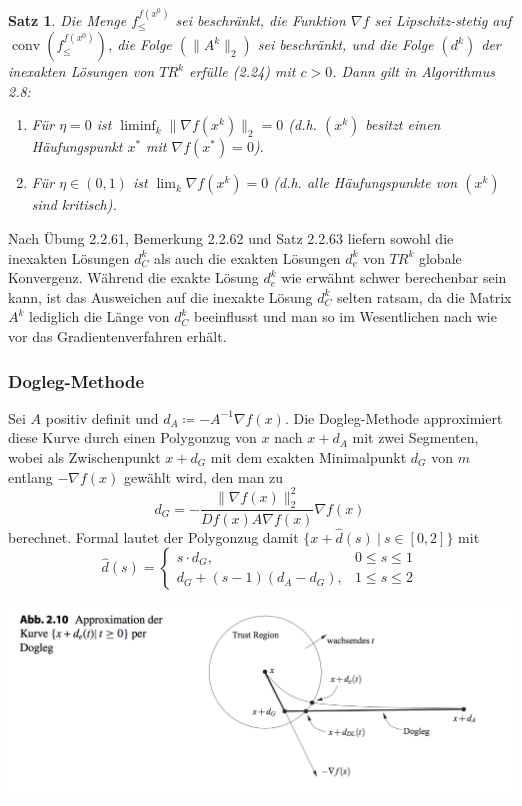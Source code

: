 \documentclass[11pt]{scrreprt}
\newcounter{thm}
\theoremstyle{thmstyle}
\numberwithin{thm}{section}
\newtheorem{satz}[thm]{Satz}
\begin{document}
\begin{satz}
	Die Menge $f_{\leq}^{f(x^0)}$ sei beschränkt, die Funktion $\nabla f$ sei Lipschitz-stetig auf $\operatorname{conv}(f_{\leq}^{f(x^0)})$, die Folge $(\|A^k\|_2)$ sei beschränkt, und die Folge $(d^k)$ der inexakten Lösungen von $TR^k$ erfülle (2.24) mit $c > 0$. Dann gilt in Algorithmus 2.8:
	\begin{enumerate}[label=\alph*\upshape)]
		\item Für $\eta = 0$ ist $\liminf_k \| \nabla f(x^k) \|_2 = 0$ (d.h. $(x^k)$ besitzt einen Häufungspunkt $x^*$ mit $\nabla f(x^*) = 0$).
		\item Für $\eta \in (0, 1)$ ist $\lim_k  \nabla f(x^k) = 0$ (d.h. alle Häufungspunkte von $(x^k)$ sind kritisch).
	\end{enumerate}
\end{satz}

Nach Übung 2.2.61, Bemerkung 2.2.62 und Satz 2.2.63 liefern sowohl die inexakten Lösungen $d_C^k$ als auch die exakten Lösungen $d_e^k$ von $TR^k$ globale Konvergenz. Während die exakte Lösung $d_e^k$ wie erwähnt schwer berechenbar sein kann, ist das Ausweichen auf die inexakte Lösung $d_C^k$ selten ratsam, da die Matrix $A^k$ lediglich die Länge von $d_C^k$ beeinflusst und man so im Wesentlichen nach wie vor das Gradientenverfahren erhält.

\subsubsection*{Dogleg-Methode}

Sei $A$ positiv definit und $d_A \coloneqq - A^{-1} \nabla f(x)$. Die Dogleg-Methode approximiert diese Kurve durch einen Polygonzug von $x$ nach $x+d_A$ mit zwei Segmenten, wobei als Zwischenpunkt $x+d_G$ mit dem exakten Minimalpunkt $d_G$ von $m$ entlang $-\nabla f(x)$ gewählt wird, den man zu
$$ d_G = - \frac{\| \nabla f(x) \|_2^2}{D f(x) A \nabla f(x)} \nabla f(x) $$
berechnet. Formal lautet der Polygonzug damit $\{ x + \hat{d}(s) ~|~ s \in [0, 2] \}$ mit
$$ \hat{d}(s) = \begin{cases}
	s \cdot d_G, & 0 \leq s \leq 1 \\ d_G + (s-1) (d_A - d_G), & 1 \leq s \leq 2
\end{cases} $$

\begin{center}
	\includegraphics[scale=0.5]{img/ab210}
\end{center}
\end{document}
